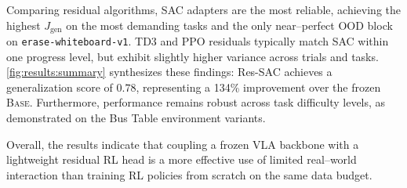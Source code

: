 Comparing residual algorithms, SAC adapters are the most reliable, achieving the highest $J_{\text{gen}}$ on the most demanding tasks and the only near–perfect OOD block on \texttt{erase-whiteboard-v1}. TD3 and PPO residuals typically match SAC within one progress level, but exhibit slightly higher variance across trials and tasks. \cref{fig:results:summary} synthesizes these findings: Res-SAC achieves a generalization score of $0.78$, representing a 134\% improvement over the frozen \textsc{Base}. Furthermore, performance remains robust across task difficulty levels, as demonstrated on the Bus Table environment variants.


Overall, the results indicate that coupling a frozen VLA backbone with a lightweight residual RL head is a more effective use of limited real–world interaction than training RL policies from scratch on the same data budget.
